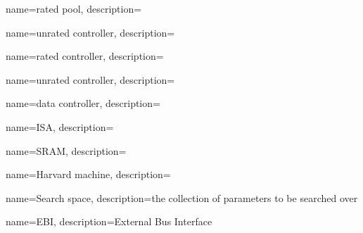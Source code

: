 {
name=rated pool,
description={}
}

{
name=unrated controller,
description={}
}

{
name=rated controller,
description={}
}

{
name=unrated controller,
description={}
}

{
name=data controller,
description={}
}

{
name=ISA,
description={}
}

{
name=SRAM,
description={}
}

{
name=Harvard machine,
description={}
}

{
name=Search space,
description={the collection of parameters to be searched over}
}

{
name=EBI,
description={External Bus Interface}
}
